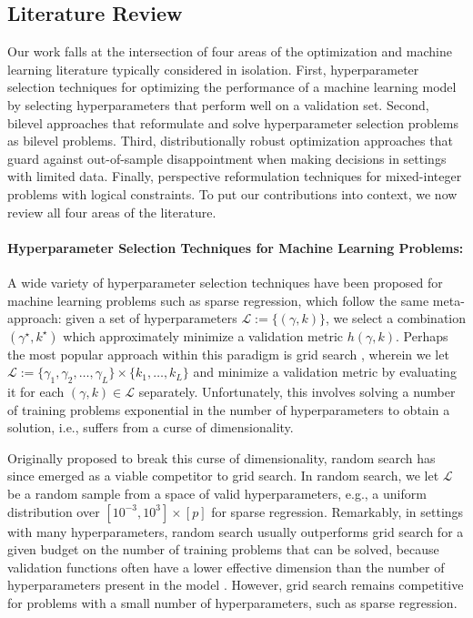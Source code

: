 \documentclass[opre,nonblindrev]{informs3} %
\begin{document}
\subsection{Literature Review}
Our work falls at the intersection of four areas of the optimization and machine learning literature typically considered in isolation. First, hyperparameter selection techniques for optimizing the performance of a machine learning model by selecting hyperparameters that perform well on a validation set. %
Second, bilevel approaches that reformulate and solve hyperparameter selection problems as bilevel problems. Third, distributionally robust optimization approaches that guard against out-of-sample disappointment when making decisions in settings with limited data. Finally, perspective reformulation techniques for mixed-integer problems with logical constraints. To put our contributions into context, we now review all four areas of the literature.

\paragraph{Hyperparameter Selection Techniques for Machine Learning Problems:} 
A wide variety of hyperparameter selection techniques have been proposed for machine learning problems such as sparse regression, %
which follow the same meta-approach: given a set of hyperparameters $\mathcal{L}:=\{(\gamma, k)\}$, we select a combination $(\gamma^\star, k^\star)$ which approximately minimize a validation metric $h(\gamma, k)$. Perhaps the most popular approach within this paradigm is grid search \citep[][]{larochelle2007empirical}, wherein we let $\mathcal{L}:=\{\gamma_1, \gamma_2, \ldots, \gamma_L\} \times \{k_1, \ldots, k_L\}$ and minimize a validation metric by evaluating it for each $(\gamma, k) \in \mathcal{L}$ separately. Unfortunately, this involves solving a number of training problems exponential in the number of hyperparameters to obtain a solution, i.e., suffers from a curse of dimensionality.%


Originally proposed to break this curse of dimensionality, random search \citep[c.f.][]{bergstra2012random} has since emerged as a viable competitor to grid search. In random search, we let $\mathcal{L}$ be a random sample from a space of valid hyperparameters, e.g., a uniform distribution over $[10^{-3}, 10^3] \times [p]$ for sparse regression. Remarkably, in settings with many hyperparameters, random search usually outperforms grid search for a given budget on the number of training problems that can be solved, because validation functions often have a lower effective dimension than the number of hyperparameters present in the model \citep[][]{bergstra2012random}. %
However, grid search remains competitive for problems with a small number of hyperparameters, such as sparse regression. %
\end{document}
